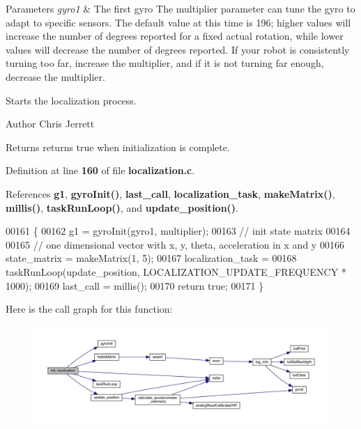 \begin{DoxyParams}{Parameters}
{\em gyro1} & The first gyro  The multiplier parameter can tune the gyro to adapt to specific sensors. The default value at this time is 196; higher values will increase the number of degrees reported for a fixed actual rotation, while lower values will decrease the number of degrees reported. If your robot is consistently turning too far, increase the multiplier, and if it is not turning far enough, decrease the multiplier.\\
\hline
\end{DoxyParams}
Starts the localization process.

\begin{DoxyAuthor}{Author}
Chris Jerrett 
\end{DoxyAuthor}
\begin{DoxyReturn}{Returns}
returns true when initialization is complete. 
\end{DoxyReturn}


Definition at line \textbf{ 160} of file \textbf{ localization.\+c}.



References \textbf{ g1}, \textbf{ gyro\+Init()}, \textbf{ last\+\_\+call}, \textbf{ localization\+\_\+task}, \textbf{ make\+Matrix()}, \textbf{ millis()}, \textbf{ task\+Run\+Loop()}, and \textbf{ update\+\_\+position()}.


\begin{DoxyCode}
00161                                                                   \{
00162   g1 = gyroInit(gyro1, multiplier);
00163   \textcolor{comment}{// init state matrix}
00164 
00165   \textcolor{comment}{// one dimensional vector with x, y, theta, acceleration in x and y}
00166   state_matrix = makeMatrix(1, 5);
00167   localization_task =
00168       taskRunLoop(update_position, LOCALIZATION\_UPDATE\_FREQUENCY * 1000);
00169   last_call = millis();
00170   \textcolor{keywordflow}{return} \textcolor{keyword}{true};
00171 \}
\end{DoxyCode}
Here is the call graph for this function\+:
\nopagebreak
\begin{figure}[H]
\begin{center}
\leavevmode
\includegraphics[width=350pt]{localization_8h_afdd0147de6aa15957e9a125f9cd20578_cgraph}
\end{center}
\end{figure}
\mbox{\label{localization_8h_afacd5e0b3d5e677df26a4402bbd9ec9e}} 

